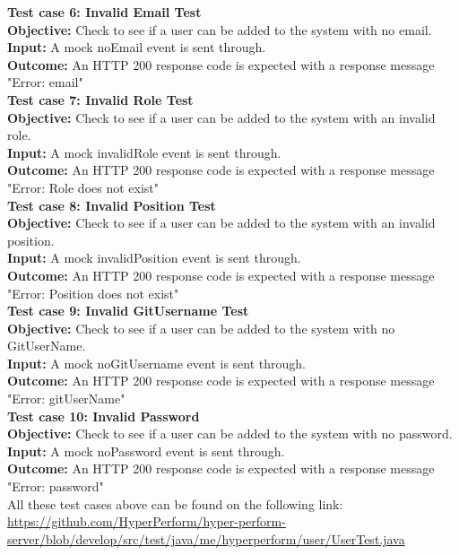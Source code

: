 \documentclass[11pt,a4paper]{article}
\begin{document}
\textbf{Test case 6: Invalid Email Test} \\
\textbf{Objective: } Check to see if a user can be added to the system with no email. \\
\textbf{Input: }  A mock noEmail event is sent through.\\
\textbf{Outcome: } An HTTP 200 response code is expected with a response message "Error: email" \\

\textbf{Test case 7: Invalid Role Test} \\
\textbf{Objective: } Check to see if a user can be added to the system with an invalid role. \\
\textbf{Input: }  A mock invalidRole event is sent through.\\
\textbf{Outcome: } An HTTP 200 response code is expected with a response message "Error: Role does not exist" \\


\textbf{Test case 8: Invalid Position Test} \\
\textbf{Objective: } Check to see if a user can be added to the system with an invalid position. \\
\textbf{Input: }  A mock invalidPosition event is sent through.\\
\textbf{Outcome: } An HTTP 200 response code is expected with a response message "Error: Position does not exist" \\


\textbf{Test case 9: Invalid GitUsername Test} \\
\textbf{Objective: } Check to see if a user can be added to the system with no GitUserName. \\
\textbf{Input: }  A mock noGitUsername event is sent through.\\
\textbf{Outcome: } An HTTP 200 response code is expected with a response message "Error: gitUserName" \\


\textbf{Test case 10: Invalid Password} \\
\textbf{Objective: } Check to see if a user can be added to the system with no password. \\
\textbf{Input: }  A mock noPassword event is sent through.\\
\textbf{Outcome: } An HTTP 200 response code is expected with a response message "Error: password" \\

All these test cases above can be found on the following link: \url{https://github.com/HyperPerform/hyper-perform-server/blob/develop/src/test/java/me/hyperperform/user/UserTest.java}
\end{document}
